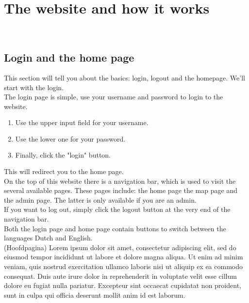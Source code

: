 \documentclass[a4paper]{article}
\begin{document}
\pagebreak

\section{The website and how it works}
~\\

\subsection{Login and the home page}
This section will tell you about the basics: login, logout and the homepage. We'll start with the login.
\\
The login page is simple, use your username and password to login to the website.

\begin{enumerate}
\item Use the upper input field for your username.
\item Use the lower one for your password.
\item Finally, click the "login" button.
\end{enumerate}

\noindent
This will redirect you to the home page.
\\
On the top of this website there is a navigation bar, which is used to visit the several available pages. These pages include: the home page the map page and the admin page. The latter is only available if you are an admin.
\\
If you want to log out, simply click the logout button at the very end of the navigation bar.
\\
Both the login page and home page contain buttons to switch between the languages Dutch and English.
\\
(Hoofdpagina)
Lorem ipsum dolor sit amet, consectetur adipiscing elit, sed do eiusmod tempor incididunt ut labore et dolore magna aliqua. Ut enim ad minim veniam, quis nostrud exercitation ullamco laboris nisi ut aliquip ex ea commodo consequat. Duis aute irure dolor in reprehenderit in voluptate velit esse cillum dolore eu fugiat nulla pariatur. Excepteur sint occaecat cupidatat non proident, sunt in culpa qui officia deserunt mollit anim id est laborum.
~\\
\end{document}
